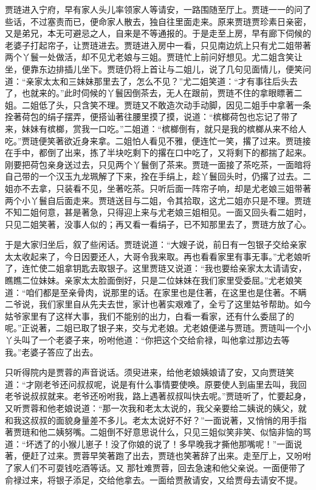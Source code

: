 \begin{parag}
    贾琏进入宁府，早有家人头儿率领家人等请安，一路围随至厅上。贾琏一一的问了些话，不过塞责而已，便命家人散去，独自往里面走来。原来贾琏贾珍素日亲密，又是弟兄，本无可避忌之人，自来是不等通报的。于是走至上房，早有廊下伺候的老婆子打起帘子，让贾琏进去。贾琏进入房中一看，只见南边炕上只有尤二姐带著两个丫鬟一处做活，却不见尤老娘与三姐。贾琏忙上前问好想见。尤二姐含笑让坐，便靠东边排插儿坐下。贾琏仍将上首让与二姐儿，说了几句见面情儿，便笑问道：“亲家太太和三妹妹那里去了，怎么不见？”尤二姐笑道：“才有事往后头去了，也就来的。”此时伺候的丫鬟因倒茶去，无人在跟前，贾琏不住的拿眼瞟著二姐。二姐低了头，只含笑不理。贾琏又不敢造次动手动脚，因见二姐手中拿著一条拴著荷包的绢子摆弄，便搭讪著往腰里摸了摸，说道：“槟榔荷包也忘记了带了来，妹妹有槟榔，赏我一口吃。”二姐道：“槟榔倒有，就只是我的槟榔从来不给人吃。”贾琏便笑著欲近身来拿。二姐怕人看见不雅，便连忙一笑，撂了过来。贾琏接在手中，都倒了出来，拣了半块吃剩下的撂在口中吃了，又将剩下的都揣了起来。刚要把荷包亲身送过去，只见两个丫鬟倒了茶来。贾琏一面接了茶吃茶，一面暗将自己带的一个汉玉九龙珮解了下来，拴在手绢上，趁丫鬟回头时，仍撂了过去。二姐亦不去拿，只装看不见，坐著吃茶。只听后面一阵帘子响，却是尤老娘三姐带著两个小丫鬟自后面走来。贾琏送目与二姐，令其拾取，这尤二姐亦只是不理。贾琏不知二姐何意，甚是著急，只得迎上来与尤老娘三姐相见。一面又回头看二姐时，只见二姐笑著，没事人似的；再又看一看绢子，已不知那里去了，贾琏方放了心。
\end{parag}


\begin{parag}
    于是大家归坐后，叙了些闲话。贾琏说道：“大嫂子说，前日有一包银子交给亲家太太收起来了，今日因要还人，大哥令我来取。再也看看家里有事无事。”尤老娘听了，连忙使二姐拿钥匙去取银子。这里贾琏又说道：“我也要给亲家太太请请安，瞧瞧二位妹妹。亲家太太脸面倒好，只是二位妹妹在我们家里受委屈。”尤老娘笑道：“咱们都是至亲骨肉，说那里的话。在家里也是住著，在这里也是住著。不瞒二爷说，我们家里自从先夫去世，家计也著实艰难了，全亏了这里姑爷帮助。如今姑爷家里有了这样大事，我们不能别的出力，白看一看家，还有什么委屈了的呢。”正说著，二姐已取了银子来，交与尤老娘。尤老娘便递与贾琏。贾琏叫一个小丫头叫了一个老婆子来，吩咐他道：“你把这个交给俞禄，叫他拿过那边去等我。”老婆子答应了出去。
\end{parag}


\begin{parag}
    只听得院内是贾蓉的声音说话。须臾进来，给他老娘姨娘请了安，又向贾琏笑道：“才刚老爷还问叔叔呢，说是有什么事情要使唤。原要使人到庙里去叫，我回老爷说叔叔就来。老爷还吩咐我，路上遇著叔叔叫快去呢。”贾琏听了，忙要起身，又听贾蓉和他老娘说道：“那一次我和老太太说的，我父亲要给二姨说的姨父，就和我这叔叔的面貌身量差不多儿。老太太说好不好？”一面说著，又悄悄的用手指著贾琏和他二姨努嘴。二姐倒不好意思说什么，只见三姐似笑非笑、似恼非恼的骂道：“坏透了的小猴儿崽子！没了你娘的说了！多早晚我才撕他那嘴呢！”一面说著，便赶了过来。贾蓉早笑著跑了出去，贾琏也笑著辞了出来。走至厅上，又吩咐了家人们不可耍钱吃酒等话。又 那牡难贾蓉，回去急速和他父亲说。一面便带了俞禄过来，将银子添足，交给他拿去。一面给贾赦请安，又给贾母去请安不提。
\end{parag}


